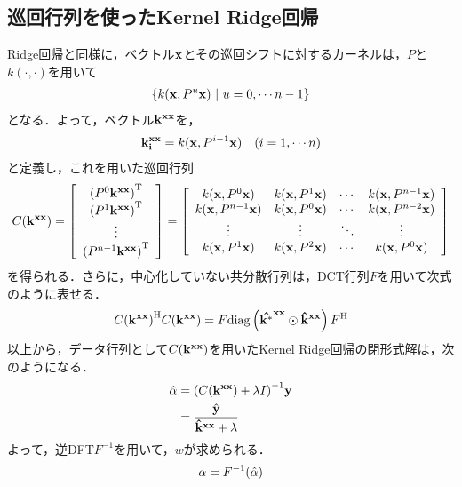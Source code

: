 \documentclass[11pt,a4j]{jarticle}
\begin{document}
    \subsection{巡回行列を使ったKernel Ridge回帰}
      Ridge回帰と同様に，ベクトル${\bf x}$とその巡回シフトに対するカーネルは，$P$と$k(\cdot,\cdot)$を用いて
      \begin{align}
        \left\{ k({\bf x}, {P}^{u}{\bf x}) ~|~ u=0,\cdots n-1 \right\} 
      \end{align}
      となる．よって，ベクトル${\bf {k}^{xx}}$を，
      \begin{align}
        {\bf k^{xx}_{i}} = k({\bf x}, {P}^{i-1}{\bf x}) ~~~ (i=1,\cdots n)
      \end{align}
      と定義し，これを用いた巡回行列
      \begin{align}
        C({\bf k^{xx}}) = 
        \left[
          \begin{array}{c}
            {({P}^{0} {\bf k^{xx}})}^{\mathrm{T}} \\
            {({P}^{1} {\bf k^{xx}})}^{\mathrm{T}} \\
            \vdots \\
            {({P}^{n-1} {\bf k^{xx}})}^{\mathrm{T}} 
          \end{array}
        \right]
        = 
        \left[
          \begin{array}{cccc}
            k({\bf x}, P^{0}{\bf x}) & k({\bf x}, P^{1}{\bf x}) & \cdots & k({\bf x}, P^{n-1}{\bf x}) \\
            k({\bf x}, P^{n-1}{\bf x}) & k({\bf x}, P^{0}{\bf x}) & \cdots & k({\bf x}, P^{n-2}{\bf x}) \\
            \vdots&\vdots&\ddots&\vdots \\
            k({\bf x}, P^{1}{\bf x}) & k({\bf x}, P^{2}{\bf x}) &  \cdots & k({\bf x}, P^{0}{\bf x}) 
          \end{array}
        \right]
      \end{align}
      を得られる．さらに，中心化していない共分散行列は，DCT行列$F$を用いて次式のように表せる．
      \begin{align}
        {C( {\bf {k}^{xx}} ) }^{\mathrm{H}} C( {\bf {k}^{xx}} ) = F {\rm diag} \left( {\bf {\hat{k^*}}^{xx}} \odot {\bf {\hat{k}}^{xx} } \right) {F}^{\mathrm{H}} 
      \end{align}
      以上から，データ行列として$C({\bf {k}^{xx}})$を用いたKernel Ridge回帰の閉形式解は，次のようになる．
      \begin{align}
        \hat{\bf \alpha} &= { ( C( {\bf {k}^{xx}} ) + \lambda I ) }^{-1} {\bf y} \\
                &= \frac{\hat{\bf y}}{ {\bf {\hat{k}}^{xx} } + \lambda }
      \end{align}
      よって，逆DFT${F}^{-1}$を用いて，$w$が求められる．
      \begin{align}
        {\bf \alpha} = {F}^{-1}( \hat{\bf \alpha} )
      \end{align}
      
\end{document}
